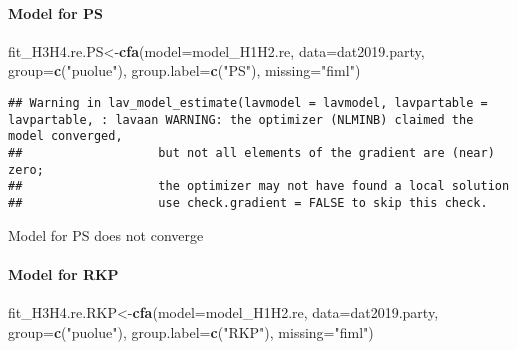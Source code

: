 \documentclass[
]{article}
\newenvironment{Shaded}{\begin{snugshade}}{\end{snugshade}}
\newcommand{\DataTypeTok}[1]{\textcolor[rgb]{0.13,0.29,0.53}{#1}}
\newcommand{\KeywordTok}[1]{\textcolor[rgb]{0.13,0.29,0.53}{\textbf{#1}}}
\newcommand{\NormalTok}[1]{#1}
\newcommand{\StringTok}[1]{\textcolor[rgb]{0.31,0.60,0.02}{#1}}
\begin{document}
\newpage

\hypertarget{model-for-ps}{%
\paragraph{Model for PS}\label{model-for-ps}}

\begin{Shaded}
\begin{Highlighting}[]
\NormalTok{fit_H3H4.re.PS<-}\KeywordTok{cfa}\NormalTok{(}\DataTypeTok{model=}\NormalTok{model_H1H2.re,}
                    \DataTypeTok{data=}\NormalTok{dat2019.party,}
                    \DataTypeTok{group=}\KeywordTok{c}\NormalTok{(}\StringTok{"puolue"}\NormalTok{),}
                    \DataTypeTok{group.label=}\KeywordTok{c}\NormalTok{(}\StringTok{"PS"}\NormalTok{),}
                    \DataTypeTok{missing=}\StringTok{"fiml"}\NormalTok{)}
\end{Highlighting}
\end{Shaded}

\begin{verbatim}
## Warning in lav_model_estimate(lavmodel = lavmodel, lavpartable = lavpartable, : lavaan WARNING: the optimizer (NLMINB) claimed the model converged,
##                   but not all elements of the gradient are (near) zero;
##                   the optimizer may not have found a local solution
##                   use check.gradient = FALSE to skip this check.
\end{verbatim}

Model for PS does not converge

\newpage

\hypertarget{model-for-rkp}{%
\paragraph{Model for RKP}\label{model-for-rkp}}

\begin{Shaded}
\begin{Highlighting}[]
\NormalTok{fit_H3H4.re.RKP<-}\KeywordTok{cfa}\NormalTok{(}\DataTypeTok{model=}\NormalTok{model_H1H2.re,}
                    \DataTypeTok{data=}\NormalTok{dat2019.party,}
                    \DataTypeTok{group=}\KeywordTok{c}\NormalTok{(}\StringTok{"puolue"}\NormalTok{),}
                    \DataTypeTok{group.label=}\KeywordTok{c}\NormalTok{(}\StringTok{"RKP"}\NormalTok{),}
                    \DataTypeTok{missing=}\StringTok{"fiml"}\NormalTok{)}
\end{Highlighting}
\end{Shaded}
\end{document}
